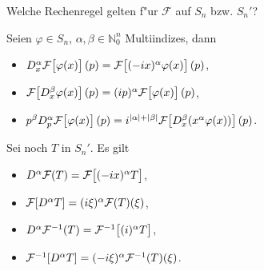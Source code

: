 \documentclass[9pt]{article}
\newcommand{\Fr}{\mathcal{F}}
\newenvironment{field}{}{\newpage}
\newif\ifnote
\newenvironment{note}{\notetrue}{\notefalse}
\begin{document}
\begin{note}
		\begin{field}  %
			Welche Rechenregel gelten f"ur $\mathcal{F}$ auf $S_n$ bzw. $S_n'$?
		\end{field}
		
		\begin{field}  %
			Seien $\varphi \in S_n$, $\alpha,\beta \in \mathbb{N}_0^n$ Multiindizes, dann
			\begin{itemize}
				\item $D^\alpha_x\Fr\qty[\varphi(x)](p) = \Fr \qty[(-ix)^\alpha\varphi(x)](p)$,
				\item $\Fr\qty[D_x^\beta\varphi(x)](p) = (ip)^\alpha\Fr\qty[\varphi(x)](p)$,
				\item $p^\beta D^\alpha_p \Fr\qty[\varphi(x)](p) = i^{\abs{\alpha} + \abs{\beta}} \Fr\qty[D^\beta_x (x^\alpha \varphi(x))](p)$.
			\end{itemize}
		
		
			Sei noch $T$ in $S_n'$. Es gilt
			\begin{itemize}
				\item $D^\alpha \Fr(T) = \Fr\qty[(-ix)^\alpha T]$,
				\item $\Fr\qty[D^\alpha T] = (i\xi)^\alpha \Fr(T)(\xi)$,
				\item $D^\alpha \Fr^{-1}(T) = \Fr^{-1}\qty[(i)^\alpha T]$,
				\item $\Fr^{-1}\qty[D^\alpha T] = (-i\xi)^\alpha \Fr^{-1}(T)(\xi)$.
			\end{itemize}
		\end{field}
		\end{note}
\end{document}
